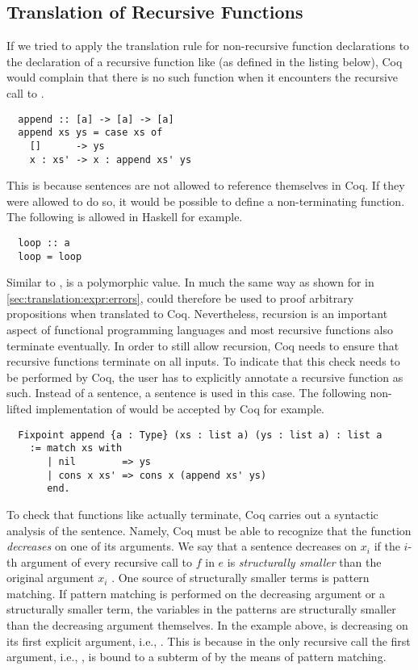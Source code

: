 \subsection{Translation of Recursive Functions}
If we tried to apply the translation rule for non-recursive function declarations to the declaration of a recursive function like  (as defined in the listing below), Coq would complain that there is no such function when it encounters the recursive call to .
\begin{verbatim}
  append :: [a] -> [a] -> [a]
  append xs ys = case xs of
    []      -> ys
    x : xs' -> x : append xs' ys
\end{verbatim}
This is because  sentences are not allowed to reference themselves in Coq.
If they were allowed to do so, it would be possible to define a non-terminating function.
The following is allowed in Haskell for example.
\begin{verbatim}
  loop :: a
  loop = loop
\end{verbatim}
Similar to ,  is a polymorphic value.
In much the same way as shown for  in \autoref{sec:translation:expr:errors},  could therefore be used to proof arbitrary propositions when translated to Coq.
Nevertheless, recursion is an important aspect of functional programming languages and most recursive functions also terminate eventually.
In order to still allow recursion, Coq needs to ensure that recursive functions terminate on all inputs.
To indicate that this check needs to be performed by Coq, the user has to explicitly annotate a recursive function as such.
Instead of a  sentence, a  sentence is used in this case.
The following non-lifted implementation of  would be accepted by Coq for example.
\begin{verbatim}
  Fixpoint append {a : Type} (xs : list a) (ys : list a) : list a
    := match xs with
       | nil        => ys
       | cons x xs' => cons x (append xs' ys)
       end.
\end{verbatim}
To check that functions like  actually terminate, Coq carries out a syntactic analysis of the  sentence.
Namely, Coq must be able to recognize that the function \textit{decreases} on one of its arguments.
We say that a  sentence  decreases on $x_i$ if the $i$-th argument of every recursive call to $f$ in $e$ is \textit{structurally smaller} than the original argument $x_i$ \cite[p.~111]{CoqDevTeam:2018}.
One source of structurally smaller terms is pattern matching.
If pattern matching is performed on the decreasing argument or a structurally smaller term, the variables in the patterns are structurally smaller than the decreasing argument themselves.
In the example above,  is decreasing on its first explicit argument, i.e., .
This is because in the only recursive call  the first argument, i.e., , is bound to a subterm of  by the means of pattern matching.

